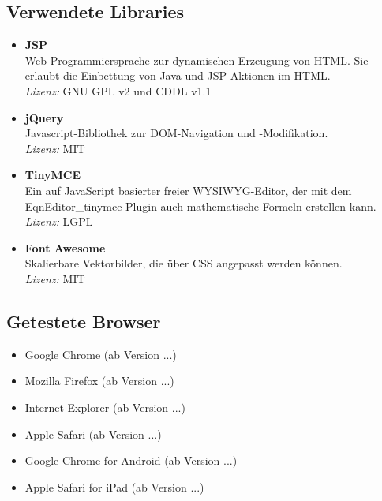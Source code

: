 \subsection{Verwendete Libraries}
\begin{itemize}
	\item \textbf{JSP} \\
	Web-Programmiersprache zur dynamischen Erzeugung von HTML. Sie erlaubt die Einbettung von Java und JSP-Aktionen im HTML. \\
	\textit{Lizenz:} GNU GPL v2 und CDDL v1.1
	\item \textbf{jQuery} \\
	Javascript-Bibliothek zur DOM-Navigation und -Modifikation.\\
	\textit{Lizenz:} MIT
	\item \textbf{TinyMCE} \\
	Ein auf JavaScript basierter freier WYSIWYG-Editor, der mit dem EqnEditor\_tinymce Plugin auch mathematische Formeln erstellen kann. \\
	\textit{Lizenz:} LGPL
	\item \textbf{Font Awesome} \\
	Skalierbare Vektorbilder, die über CSS angepasst werden können. \\
	\textit{Lizenz:} MIT
\end{itemize}

\subsection{Getestete Browser}
\begin{itemize}
	\item Google Chrome (ab Version ...)
	\item Mozilla Firefox (ab Version ...)
	\item Internet Explorer (ab Version ...)
	\item Apple Safari (ab Version ...)
	\item Google Chrome for Android (ab Version ...)
	\item Apple Safari for iPad (ab Version ...)
\end{itemize}